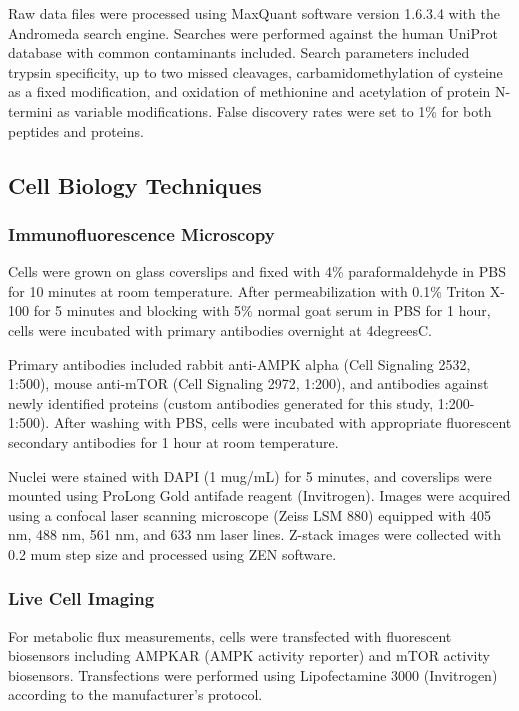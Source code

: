 \documentclass[11pt,a4paper]{article}
\begin{document}
Raw data files were processed using MaxQuant software version 1.6.3.4 with the Andromeda search engine. Searches were performed against the human UniProt database with common contaminants included. Search parameters included trypsin specificity, up to two missed cleavages, carbamidomethylation of cysteine as a fixed modification, and oxidation of methionine and acetylation of protein N-termini as variable modifications. False discovery rates were set to 1\% for both peptides and proteins.

\subsection{Cell Biology Techniques}

\subsubsection{Immunofluorescence Microscopy}

Cells were grown on glass coverslips and fixed with 4\% paraformaldehyde in PBS for 10 minutes at room temperature. After permeabilization with 0.1\% Triton X-100 for 5 minutes and blocking with 5\% normal goat serum in PBS for 1 hour, cells were incubated with primary antibodies overnight at 4degreesC.

Primary antibodies included rabbit anti-AMPK alpha (Cell Signaling 2532, 1:500), mouse anti-mTOR (Cell Signaling 2972, 1:200), and antibodies against newly identified proteins (custom antibodies generated for this study, 1:200-1:500). After washing with PBS, cells were incubated with appropriate fluorescent secondary antibodies for 1 hour at room temperature.

Nuclei were stained with DAPI (1 mug/mL) for 5 minutes, and coverslips were mounted using ProLong Gold antifade reagent (Invitrogen). Images were acquired using a confocal laser scanning microscope (Zeiss LSM 880) equipped with 405 nm, 488 nm, 561 nm, and 633 nm laser lines. Z-stack images were collected with 0.2 mum step size and processed using ZEN software.

\subsubsection{Live Cell Imaging}

For metabolic flux measurements, cells were transfected with fluorescent biosensors including AMPKAR (AMPK activity reporter) and mTOR activity biosensors. Transfections were performed using Lipofectamine 3000 (Invitrogen) according to the manufacturer's protocol.
\end{document}
